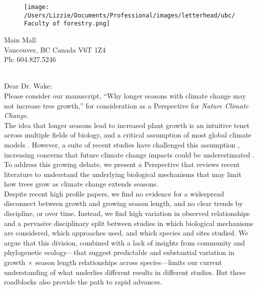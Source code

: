\documentclass[11pt,a4paper]{article}
\begin{document}

\begin{figure}[htbp]
\hspace*{14cm}                                                           
\hspace{-35ex} \texttt{[image: /Users/Lizzie/Documents/Professional/images/letterhead/ubc/Faculty of forestry.png]}
\end{figure}
\vspace{-10ex}
\begin{small}
 Main Mall \\
\noindent Vancouver, BC Canada V6T 1Z4\\
\noindent Ph: 604.827.5246\\
\end{small}
\vspace{2ex}\\
\noindent Dear Dr. Wake: %
\vspace{1.5ex}\\
Please consider our manuscript, ``Why longer seasons with climate change may not increase tree growth,'' for consideration as a Perspective for \emph{Nature Climate Change}. 
\vspace{1.5ex}\\
The idea that longer seasons lead to increased plant growth is an intuitive tenet across multiple fields of biology, and a critical assumption of most global climate models \citep{friedlingstein2022global}. However, a suite of recent studies have challenged this assumption \citep[e.g.][]{dow2022warm,green2022limits}, increasing concerns that future climate change impacts could be underestimated \citep{green2022limits,korner2023four}. To address this growing debate, we present a Perspective that reviews recent literature to understand the underlying biological mechanisms that may limit how trees grow as climate change extends seasons.  
\vspace{1.5ex}\\
Despite recent high profile papers, we find no evidence for a widespread disconnect between growth and growing season length, and no clear trends by discipline, or over time. Instead, we find high variation in observed relationships and a pervasive disciplinary split between studies in which biological mechanisms are considered, which approaches used, and which species and sites studied. We argue that this division, combined with a lack of insights from community and phylogenetic ecology---that suggest predictable and substantial variation in growth $\times$ season length relationships across species---limits our current understanding of what underlies different results in different studies. But these roadblocks also provide the path to rapid advances. 
\end{document}
